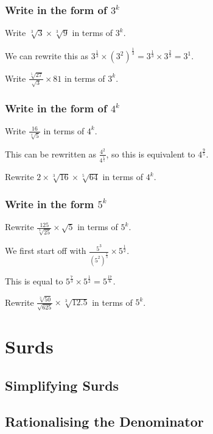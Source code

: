 \documentclass[../maths.tex]{subfiles}
\begin{document}
\subsubsection*{Write in the form of $3^k$}
\smallbreak
\begin{example}
    Write $\sqrt[3]{3} \times \sqrt[3]{9}$ in terms of $3^k$.

    We can rewrite this as $3^{\frac{1}{3}} \times (3^2)^{\frac{1}{3}} = 3^{\frac{1}{3}}\times 3^{\frac{2}{3}} = 3^1$.
\end{example}

\ex Write $\frac{\sqrt[5]{27}}{\sqrt{3}}\times 81$ in terms of $3^k$.

\subsubsection*{Write in the form of $4^k$}
\smallbreak
\begin{example}
    Write $\frac{16}{\sqrt[4]{5}}$ in terms of $4^k$.

    This can be rewritten as $\frac{4^2}{4^{\frac{1}{5}}}$, so this is equivalent to $4^{\frac{9}{5}}$.
\end{example}
\ex Rewrite $2\times \sqrt[3]{16} \times \sqrt[5]{64}$ in terms of $4^k$.

\subsubsection*{Write in the form $5^k$}
\smallbreak
\begin{example}
    Rewrite $\frac{125}{\sqrt[3]{25}}\times \sqrt{5}$ in terms of $5^k$.

    We first start off with $\frac{5^3}{(5^2)^{\frac{1}{3}}}\times 5^{\frac{1}{2}}$. 

    This is equal to $5^{\frac{7}{3}}\times 5^{\frac{1}{2}} = 5^{\frac{17}{6}}$.
\end{example}
\ex Rewrite $\frac{\sqrt[3]{50}}{\sqrt{625}}\times \sqrt[3]{12.5}$ in terms of $5^k$.

\section{Surds}
\subsection*{Simplifying Surds}
\subsection*{Rationalising the Denominator}
\end{document}
